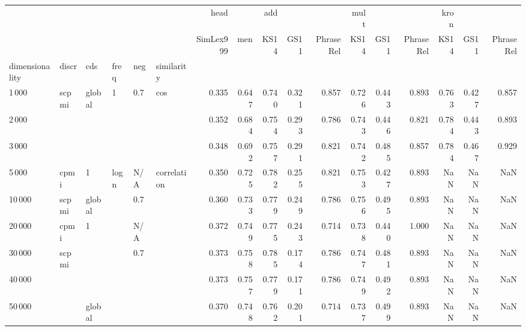 \begin{tabular}{llllllrrrrrrrrrrr}
\toprule
      &      &   &   &     &             &      head &        &    add &        &           &   mult &        &           &   kron &        &           \\
      &      &   &   &     &             & SimLex999 &    men &   KS14 &   GS11 & PhraseRel &   KS14 &   GS11 & PhraseRel &   KS14 &   GS11 & PhraseRel \\
dimensionality & discr & cds & freq & neg & similarity &           &        &        &        &           &        &        &           &        &        &           \\
\midrule
1\,000  & scpmi & global & 1 & 0.7 & cos &     0.335 &  0.647 &  0.740 &  0.321 &     0.857 &  0.726 &  0.443 &     0.893 &  0.763 &  0.427 &     0.857 \\
2\,000  &      &   &   &     &             &     0.352 &  0.684 &  0.754 &  0.293 &     0.786 &  0.743 &  0.446 &     0.821 &  0.784 &  0.443 &     0.893 \\
3\,000  &      &   &   &     &             &     0.348 &  0.692 &  0.757 &  0.291 &     0.821 &  0.742 &  0.485 &     0.857 &  0.784 &  0.467 &     0.929 \\
5\,000  & cpmi & 1 & logn & N/A & correlation &     0.350 &  0.725 &  0.782 &  0.255 &     0.821 &  0.753 &  0.427 &     0.893 &    NaN &    NaN &       NaN \\
10\,000 & scpmi & global &   & 0.7 &             &     0.360 &  0.733 &  0.779 &  0.249 &     0.786 &  0.756 &  0.495 &     0.893 &    NaN &    NaN &       NaN \\
20\,000 & cpmi & 1 &   & N/A &             &     0.372 &  0.749 &  0.775 &  0.243 &     0.714 &  0.738 &  0.440 &     1.000 &    NaN &    NaN &       NaN \\
30\,000 & scpmi &   &   & 0.7 &             &     0.373 &  0.758 &  0.785 &  0.174 &     0.786 &  0.747 &  0.481 &     0.893 &    NaN &    NaN &       NaN \\
40\,000 &      &   &   &     &             &     0.373 &  0.757 &  0.779 &  0.171 &     0.786 &  0.749 &  0.492 &     0.893 &    NaN &    NaN &       NaN \\
50\,000 &      & global &   &     &             &     0.370 &  0.748 &  0.762 &  0.201 &     0.714 &  0.737 &  0.499 &     0.893 &    NaN &    NaN &       NaN \\
\bottomrule
\end{tabular}
